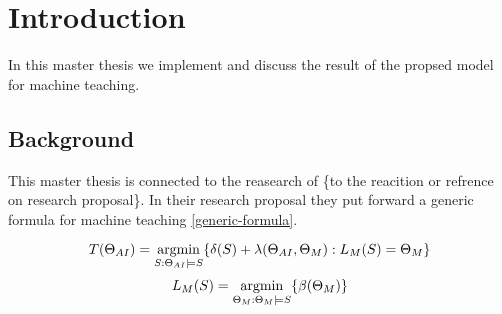 \chapter{Introduction}

In this master thesis we implement and discuss the result of the propsed model 
for machine teaching. 

\section{Background}
This master thesis is connected to the reasearch of \{to the reacition or refrence on research proposal\}.
In their research proposal they put forward a generic formula for machine teaching \ref{generic-formula}. 

\begin{equation}
    \label{generic-formula}
    \centering
    T(\Theta_{AI})=\argmin_{S: \Theta_{AI} \models S} \{\delta(S)+\lambda (\Theta_{AI}, \Theta_M):L_M(S)=\Theta_M\}
\end{equation}
\begin{equation}
    \label{LM-formula}
    \centering
    L_M(S)=\argmin_{\Theta_M :\Theta_M \models S} \{\beta(\Theta_M)\}
\end{equation}
